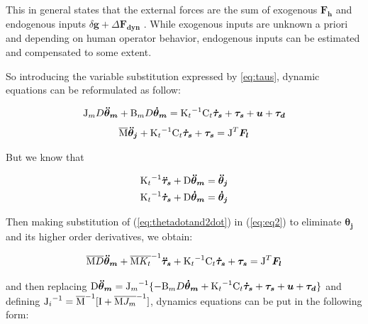 \documentclass[journal]{IEEEtran}
\newcommand{\vectm}[1]{ { {\text #1} }}
\newcommand{\vects}[1]{{\boldsymbol {#1}}}
\begin{document}
This in general states that the external forces are the sum of exogenous $\vects{F_h} $ and endogenous inputs  $ \delta \vects{g} + \Delta \vects{F_{dyn}}$ . While exogenous inputs are unknown a priori and depending on human operator behavior, endogenous inputs can be estimated and compensated to some extent.

So introducing the variable substitution expressed by \eqref{eq:taus}, dynamic equations can be reformulated as follow:

\setlength{\arraycolsep}{0.0em}
\begin{eqnarray}
\label{eq:eq1}
\vectm{J_m  D} \vects{\ddot{\theta}_m} + \vectm{B_m  D}  \vects{\dot{\theta}_m} = \vectm{K_t}^{-1} \vectm{C_t} \vects{\dot{\tau}_s} + \vects{\tau_s} + \vects{u} + \vects{\tau_d}
\end{eqnarray}
\begin{eqnarray}
\label{eq:eq2}
\overline{\vectm{M}} \vects{\ddot{\theta}_j}  + \vectm{K_t}^{-1} \vectm{C_t}  \vects{\dot{\tau}_s} + \vects{\tau_s} = \vectm{J}^T  \vects{F_{l}}
\end{eqnarray}
\setlength{\arraycolsep}{5pt}

But we know that

\begin{equation}
\label{eq:thetadotand2dot}
\begin{aligned}
\vectm{K_t}^{-1}\vects{\ddot{\tau}_s} + \vectm{D} \vects{\ddot{\theta}_m}  & =   \vects{\ddot{\theta}_j}  \\
\vectm{K_t}^{-1}\vects{\dot{\tau}_s} + \vectm{D} \vects{\dot{\theta}_m}   & =    \vects{\dot{\theta}_j}  
\end{aligned}
\end{equation}

Then making substitution of (\ref{eq:thetadotand2dot}) in  (\ref{eq:eq2}) to eliminate $ \vects{\theta_j}$ and its higher order derivatives, we obtain:

\begin{equation}
\overline{\vectm{M}  D}\vects{\ddot{\theta}_m } + \overline{\vectm{M} K_t}^{-1} \vects{\ddot{\tau}_s} + \vectm{K_t}^{-1} \vectm{C_t}\vects{\dot{\tau}_s}  + \vects{\tau_s}  =  \vectm{J}^T \vects{F_l}
\end{equation}

and then replacing $\vectm{D}\vects{\ddot{\theta}_m}=\vectm{J_m}^{-1} \{ -\vectm{B_m  D}  \vects{\dot{\theta}_m} + \vectm{K_t}^{-1} \vectm{C_t} \vects{\dot{\tau}_s} + \vects{\tau_s} +\vects{u}  +\vects{\tau_d} \} $
and defining  $\vectm{J_i}^{-1}= \overline{\vectm{M}}^{-1}[\vectm{I} + \overline{\vectm{M} J_m}^{-1}]$,  dynamics equations can be put in the following form:
\end{document}
